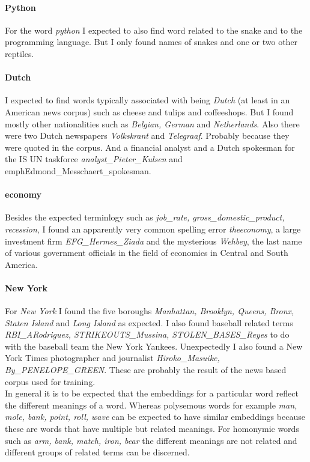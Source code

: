 \documentclass[11pt]{article}
\begin{document}
\paragraph{Python}
For the word \emph{python} I expected to also find word related to the snake and to the programming language. But I only found names of snakes and one or two other reptiles.

\paragraph{Dutch}
I expected to find words typically associated with being \emph{Dutch} (at least in an American news corpus) such as cheese and tulips and coffeeshops. But I found mostly other nationalities such as \emph{Belgian, German} and \emph{Netherlands}. Also there were two Dutch newspapers \emph{Volkskrant} and \emph{Telegraaf}. Probably because they were quoted in the corpus. And a financial analyst and a Dutch spokesman for the IS UN taskforce \emph{analyst\_Pieter\_Kulsen} and emph{Edmond\_Messchaert\_spokesman}.

\paragraph{economy}
Besides the expected terminlogy such as \emph{job\_rate, gross\_domestic\_product, recession}, I found an apparently very common  spelling error \emph{theeconomy}, a large investment firm \emph{EFG\_Hermes\_Ziada} and the mysterious \emph{Wehbey}, the last name of various government officials in the field of economics in Central and South America.

\paragraph{New York}
For \emph{New York} I found the five boroughs \emph{Manhattan, Brooklyn, Queens, Bronx, Staten Island} and \emph{Long Island} as expected. I also found baseball related terms \emph{RBI\_ARodriguez, STRIKEOUTS\_Mussina, STOLEN\_BASES\_Reyes} to do with the baseball team the New York Yankees. Unexpectedly I also found a New York Times photographer and journalist \emph{Hiroko\_Masuike, By\_PENELOPE\_GREEN}. These are probably the result of the news based corpus used for training.
\\

In general it is to be expected that the embeddings for a particular word reflect the different meanings of a word. Whereas polysemous words for example \emph{man, mole, bank, point, roll, wave} can be expected to have similar embeddings because these are words that have multiple but related meanings. For homonymic words such as \emph{arm, bank, match, iron, bear} the different meanings are not related and different groups of related terms can be discerned.
\end{document}
